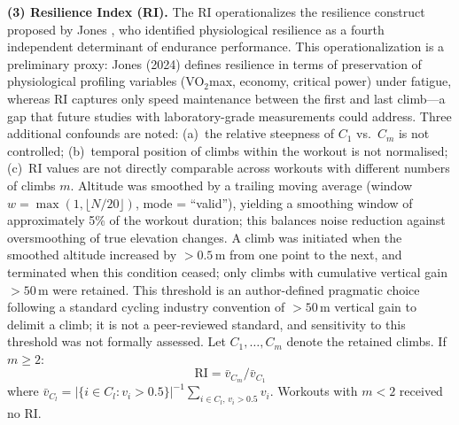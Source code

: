 \documentclass[times, twoside]{zHenriquesLab-StyleBioRxiv}
\begin{document}
\textbf{(3) Resilience Index (RI).} The RI operationalizes the resilience construct proposed by Jones \cite{jones2024}, who identified physiological resilience as a fourth independent determinant of endurance performance. This operationalization is a preliminary proxy: Jones (2024) defines resilience in terms of preservation of physiological profiling variables (VO$_2$max, economy, critical power) under fatigue, whereas RI captures only speed maintenance between the first and last climb---a gap that future studies with laboratory-grade measurements could address. Three additional confounds are noted: (a)~the relative steepness of $C_1$ vs.\ $C_m$ is not controlled; (b)~temporal position of climbs within the workout is not normalised; (c)~RI values are not directly comparable across workouts with different numbers of climbs $m$. Altitude was smoothed by a trailing moving average (window $w = \max(1, \lfloor N/20 \rfloor)$, mode = ``valid''), yielding a smoothing window of approximately 5\% of the workout duration; this balances noise reduction against oversmoothing of true elevation changes. A climb was initiated when the smoothed altitude increased by $> 0.5\,\mathrm{m}$ from one point to the next, and terminated when this condition ceased; only climbs with cumulative vertical gain $> 50\,\mathrm{m}$ were retained. This threshold is an author-defined pragmatic choice following a standard cycling industry convention of $>50\,\mathrm{m}$ vertical gain to delimit a climb; it is not a peer-reviewed standard, and sensitivity to this threshold was not formally assessed. Let $C_1, \ldots, C_m$ denote the retained climbs. If $m \geq 2$:
\[
  \text{RI} = \bar{v}_{C_m} / \bar{v}_{C_1}
\]
where $\bar{v}_{C_l} = |\{i \in C_l : v_i > 0.5\}|^{-1} \sum_{i \in C_l,\, v_i > 0.5} v_i$.
Workouts with $m < 2$ received no RI.
\end{document}
